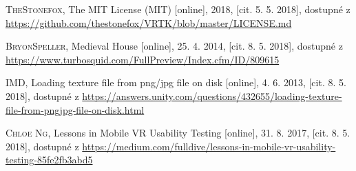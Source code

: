 \documentclass[thesis=B,czech]{FITthesis}[2012/06/26]
\begin{document}
\begin{thebibliography}{999}
  \textsc{TheStonefox},
  The MIT License (MIT) [online], 2018,
  [cit. 5. 5. 2018],
  dostupné z \url{https://github.com/thestonefox/VRTK/blob/master/LICENSE.md}
  
  \textsc{BryonSpeller},
  Medieval House [online], 25. 4. 2014,
  [cit. 8. 5. 2018],
  dostupné z \url{https://www.turbosquid.com/FullPreview/Index.cfm/ID/809615}
     
  
  \textsc{IMD},
  Loading texture file from png/jpg file on disk [online], 4. 6. 2013,
  [cit. 8. 5. 2018],
  dostupné z \url{https://answers.unity.com/questions/432655/loading-texture-file-from-pngjpg-file-on-disk.html}
   
  \textsc{Chloe Ng},
  Lessons in Mobile VR Usability Testing [online], 31. 8. 2017,
  [cit. 8. 5. 2018],
  dostupné z \url{https://medium.com/fulldive/lessons-in-mobile-vr-usability-testing-85fe2fb3abd5} 
    
  
  
\end{thebibliography}  

\appendix
\end{document}
